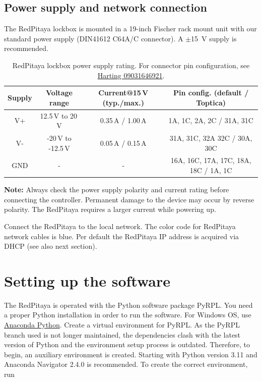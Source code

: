 \documentclass[twoside,a4paper]{refart}
\begin{document}
\subsection{Power supply and network connection}
The RedPitaya lockbox is mounted in a 19-inch Fischer rack mount unit with our standard power supply (DIN41612 C64A/C connector). A $\pm$\SI{15}{\volt} supply is recommended. 

\begin{maxipage}
	\centering
	\begin{table}[H]
		{\small
		\begin{tabular}{|c|c|c|c|}\hline
			\textbf{Supply} & \textbf{Voltage range} & \textbf{Current@15\,V (typ./max.)}	& \textbf{Pin config. (default / Toptica)}  \\\hline
			V+			& 12.5\,V to 20\,V		& 	 0.35\,A / 1.00\,A					& 1A, 1C, 2A, 2C	/  31A, 31C	 \\\hline	
			V-			& -20\,V to -12.5\,V 	&		0.05\,A / 0.15\,A					& 31A, 31C, 32A 32C	/ 30A, 30C\\\hline	 
			GND			& -					&	-										& 16A, 16C, 17A, 17C, 18A, 18C  /  1A, 1C              \\\hline
		\end{tabular}
	}
		\caption{RedPitaya lockbox power supply rating. For connector pin configuration, see \href{https://b2b.harting.com/files/download/PRD/PDF_TS/0903164X921_100072506DRW176A.pdf}{Harting 09031646921}. \label{tab:power}}
	\end{table}
\end{maxipage}

\textbf{Note:} Always check the power supply polarity and current rating before connecting the controller. Permanent damage to the device may occur by reverse polarity. The RedPitaya requires a larger current while powering up.

 Connect the RedPitaya to the local network. The color code for RedPitaya network cables is blue. Per default the RedPitaya IP address is acquired via DHCP (see also next section). 

\section{Setting up the software}

The RedPitaya is operated with the Python software package PyRPL. You need a proper Python installation in order to run the software. For Windows OS, use \href{https://www.anaconda.com/}{Anaconda Python}. Create a virtual environment for PyRPL. As the PyRPL branch used is not longer maintained, the dependencies clash with the latest version of Python and the environment setup process is outdated. Therefore, to begin, an auxiliary environment is created. Starting with Python version 3.11 and Anaconda Navigator 2.4.0 is recommended. To create the correct environment, run
\end{document}
